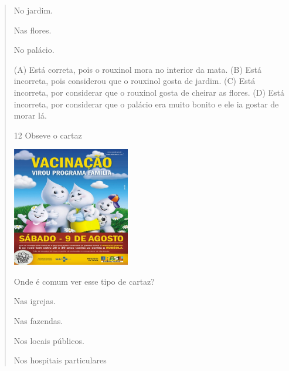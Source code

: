 \begin{verse}
\begin{escolha}
\item No jardim.

\item Nas flores.

\item No palácio.
\end{escolha}


(A) Está correta, pois o rouxinol mora no interior da mata.
(B) Está incorreta, pois considerou que o rouxinol gosta de jardim.
(C) Está incorreta, por considerar que o rouxinol gosta de cheirar as flores.
(D) Está incorreta, por considerar que o palácio era muito bonito e ele
ia gostar de morar lá.

\num{12} Obseve o cartaz

\includegraphics[width=2.01806in,height=2.05069in]{media/image159.jpeg}

Onde é comum ver esse tipo de cartaz?

\begin{minipage}{.5\textwidth}
\begin{escolha}
\item Nas igrejas.

\item Nas fazendas.

\item Nos locais públicos.

\item Nos hospitais particulares
\end{escolha}
\end{minipage}


\end{verse}
